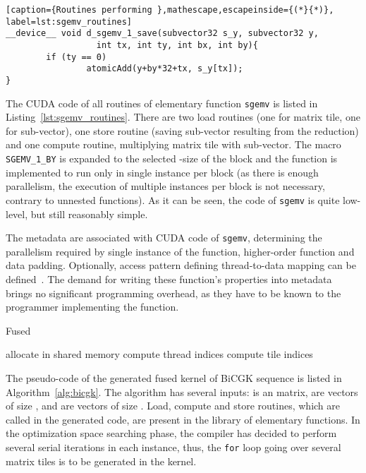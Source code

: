 \documentclass[final]{siamltex}
\begin{document}
{\begin{lstlisting}[caption={Routines performing },mathescape,escapeinside={(*}{*)}, label=lst:sgemv_routines]
__device__ void d_sgemv_1_save(subvector32 s_y, subvector32 y, 
                  int tx, int ty, int bx, int by){
        if (ty == 0)
                atomicAdd(y+by*32+tx, s_y[tx]);
}
\end{lstlisting}

The CUDA code of all routines of elementary function \texttt{sgemv} is listed in Listing~\ref{lst:sgemv_routines}. There are two load routines (one for matrix tile, one for sub-vector), one store routine (saving sub-vector resulting from the reduction) and one compute routine, multiplying matrix tile with sub-vector. The macro \texttt{SGEMV\_1\_BY} is expanded to the selected -size of the block and the function is implemented to run only in single instance per block (as there is enough parallelism, the execution of multiple instances per block is not necessary, contrary to unnested functions). As it can be seen, the code of \texttt{sgemv} is quite low-level, but still reasonably simple.

The metadata are associated with CUDA code of \texttt{sgemv}, determining the parallelism required by single instance of the function, higher-order function and data padding. Optionally, access pattern defining thread-to-data mapping can be defined~\cite{filipovic2012automatically}. The demand for writing these function's properties into metadata brings no significant programming overhead, as they have to be known to the programmer implementing the function.

\begin{algorithm}[h]
\caption{Fused }
\label{alg:bicgk}
{
\begin{algorithmic}[1]
{
\STATE allocate  in shared memory
\STATE compute thread indices
\STATE compute tile indices 
\STATE 
\STATE 
\FOR{}
\STATE 
\STATE 
\STATE 
\STATE 
\STATE 
\STATE 
\STATE 
\ENDFOR
\STATE 
}
\end{algorithmic}
}
\end{algorithm}

The pseudo-code of the generated fused kernel of BiCGK sequence is listed in Algorithm~\ref{alg:bicgk}. The algorithm has several inputs:  is an  matrix,  are vectors of size , and  are vectors of size . Load, compute and store routines, which are called in the generated code, are present in the library of elementary functions.  In the optimization space searching phase, the compiler has decided to perform several serial iterations in each instance, thus, the \texttt{for} loop going over several matrix tiles is to be generated in the kernel.

}
\end{document}
